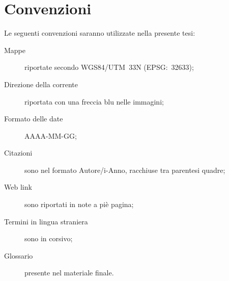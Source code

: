 \section{Convenzioni}
Le seguenti convenzioni saranno utilizzate nella presente tesi:
\begin{description}
	\item[Mappe] riportate secondo WGS84/UTM~33N (EPSG:~32633);
	\item[Direzione della corrente] riportata con una freccia blu nelle immagini;
	\item[Formato delle date] AAAA-MM-GG;
	\item[Citazioni] sono nel formato Autore/i-Anno, racchiuse tra parentesi quadre;
	\item[Web link] sono riportati in note a piè pagina;
	\item[Termini in lingua straniera] sono in corsivo;
	\item[Glossario] presente nel materiale finale.
\end{description}


